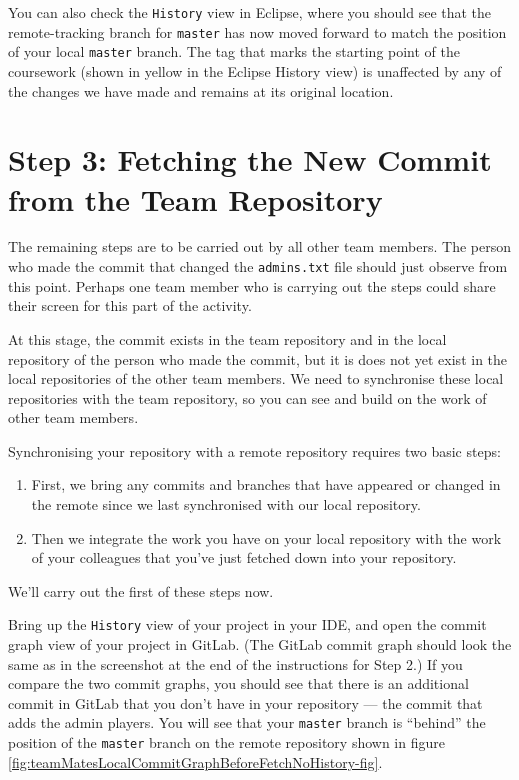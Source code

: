 \documentclass[
]{book}
\providecommand{\tightlist}{%
  \setlength{\itemsep}{0pt}\setlength{\parskip}{0pt}}
\begin{document}
You can also check the \texttt{History} view in Eclipse, where you should see that the remote-tracking branch for \texttt{master} has now moved forward to match the position of your local \texttt{master} branch. The tag that marks the starting point of the coursework (shown in yellow in the Eclipse History view) is unaffected by any of the changes we have made and remains at its original location.

\hypertarget{fetching}{%
\section{Step 3: Fetching the New Commit from the Team Repository}\label{fetching}}

The remaining steps are to be carried out by all other team members. The person who made the commit that changed the \texttt{admins.txt} file should just observe from this point. Perhaps one team member who is carrying out the steps could share their screen for this part of the activity.

At this stage, the commit exists in the team repository and in the local repository of the person who made the commit, but it is does not yet exist in the local repositories of the other team members. We need to synchronise these local repositories with the team repository, so you can see and build on the work of other team members.

Synchronising your repository with a remote repository requires two basic steps:

\begin{enumerate}
\def\labelenumi{\arabic{enumi}.}
\tightlist
\item
  First, we bring any commits and branches that have appeared or changed in the remote since we last synchronised with our local repository.
\item
  Then we integrate the work you have on your local repository with the work of your colleagues that you've just fetched down into your repository.
\end{enumerate}

We'll carry out the first of these steps now.

Bring up the \texttt{History} view of your project in your IDE, and open the commit graph view of your project in GitLab. (The GitLab commit graph should look the same as in the screenshot at the end of the instructions for Step 2.) If you compare the two commit graphs, you should see that there is an additional commit in GitLab that you don't have in your repository --- the commit that adds the admin players. You will see that your \texttt{master} branch is ``behind'' the position of the \texttt{master} branch on the remote repository shown in figure \ref{fig:teamMatesLocalCommitGraphBeforeFetchNoHistory-fig}.
\end{document}
